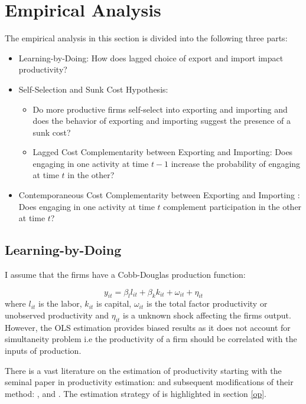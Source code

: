 \documentclass[12pt]{article}
\begin{document}
\section{Empirical Analysis}\label{sec:anal}

The empirical analysis in this section is divided into the  following three
parts:
\begin{itemize}
\item Learning-by-Doing: How does lagged choice of export and import
  impact productivity?
\item Self-Selection and Sunk Cost Hypothesis:
\begin{itemize}
\item  Do  more productive firms self-select into
  exporting and importing and does the behavior of exporting and
  importing suggest the presence of a sunk cost? 
\item Lagged Cost Complementarity between Exporting and Importing:
  Does  engaging in one activity at time $t-1$
  increase the probability of engaging at time $t$ in the other?
\end{itemize}
\item Contemporaneous Cost Complementarity between Exporting and Importing : Does engaging
  in one activity at time $t$ complement participation in the other at
  time $t$?
\end{itemize}

\subsection{Learning-by-Doing}\label{sec:lbd}

 I assume that the firms have a Cobb-Douglas
production function: 

\begin{equation}
y_{it} =   \beta_{l}l_{it} + \beta_{k}k_{it} +
\omega_{it} + \eta_{it} 
\end{equation}
where $l_{it}$ is the labor, $k_{it}$ is capital, $\omega_{it}$ is the
total factor productivity or unobserved productivity and $\eta_{it}$
is a unknown shock affecting the firms output. However, the OLS
estimation provides biased results as it does not account for
simultaneity problem i.e the productivity of a firm should be
correlated with the inputs of production. 

There is a vast literature on the estimation of productivity starting
with the seminal paper in productivity estimation: \textcite{olley1992dynamics} and subsequent
modifications of their method: \textcite{levinsohn2003estimating},
\textcite{ackerberg2006structural} and
\textcite{wooldridge2009estimating}. The estimation strategy of
\textcite{olley1992dynamics} is highlighted in section \ref{op}. 
\end{document}
